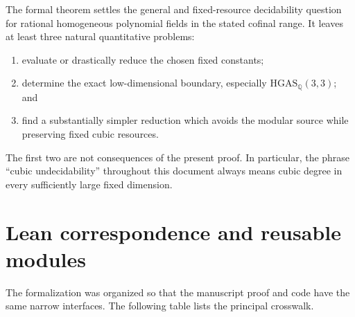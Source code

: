 \documentclass[11pt]{article}
\newcommand{\Q}{\mathbb Q}
\newcommand{\HGAS}{\mathrm{HGAS}}
\begin{document}
The formal theorem settles the general and fixed-resource decidability
question for rational homogeneous polynomial fields in the stated
cofinal range.  It leaves at least three natural quantitative problems:

\begin{enumerate}
\item evaluate or drastically reduce the chosen fixed constants;
\item determine the exact low-dimensional boundary, especially
  \(\HGAS_{\Q}(3,3)\); and
\item find a substantially simpler reduction which avoids the modular
  source while preserving fixed cubic resources.
\end{enumerate}

The first two are not consequences of the present proof.  In particular,
the phrase ``cubic undecidability'' throughout this document always means
cubic degree in every sufficiently large fixed dimension.

\section{Lean correspondence and reusable modules}
\label{sec:crosswalk}

The formalization was organized so that the manuscript proof and code have
the same narrow interfaces.  The following table lists the principal
crosswalk.
\end{document}
